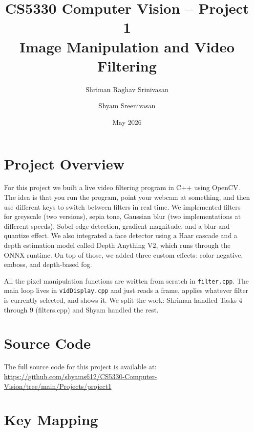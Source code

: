 \documentclass[11pt,letterpaper]{article}
\title{\textbf{CS5330 Computer Vision -- Project 1}\\
       \large Image Manipulation and Video Filtering}
\author{Shriman Raghav Srinivasan \and Shyam Sreenivasan}
\date{May 2026}
\begin{document}
\maketitle

\section*{Project Overview}

For this project we built a live video filtering program in C++ using OpenCV.
The idea is that you run the program, point your webcam at something, and then
use different keys to switch between filters in real time. We implemented
filters for greyscale (two versions), sepia tone, Gaussian blur (two
implementations at different speeds), Sobel edge detection, gradient magnitude,
and a blur-and-quantize effect. We also integrated a face detector using a Haar
cascade and a depth estimation model called Depth Anything V2, which runs
through the ONNX runtime. On top of those, we added three custom effects:
color negative, emboss, and depth-based fog.

All the pixel manipulation functions are written from scratch in
\texttt{filter.cpp}. The main loop lives in \texttt{vidDisplay.cpp} and just
reads a frame, applies whatever filter is currently selected, and shows it. We
split the work: Shriman handled Tasks 4 through 9 (filters.cpp) and Shyam
handled the rest.

\section*{Source Code}

The full source code for this project is available at:\\
\url{https://github.com/shyams612/CS5330-Computer-Vision/tree/main/Projects/project1}

\section*{Key Mapping}
\end{document}
